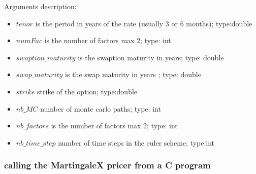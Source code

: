 Arguments description:
\begin{itemize}
\item $tenor$ is the period in years of the rate (usually 3 or 6 months); type:double 
\item $numFac$ is the number of factors max 2; type: int
\item $swaption\_maturity$ is the swaption maturity in years; type: double
\item $swap\_maturity$ is the swap maturity in years ; type: double 
\item $strike$ strike of the option; type:double
\item $nb\_MC$ number of monte carlo paths; type: int
\item $nb\_factors$ is the number of factors max 2; type: int
\item $nb\_time\_step$ number of time steps in the euler scheme; type:int 
\end{itemize}


\subsubsection{calling the MartingaleX pricer from a C program}

